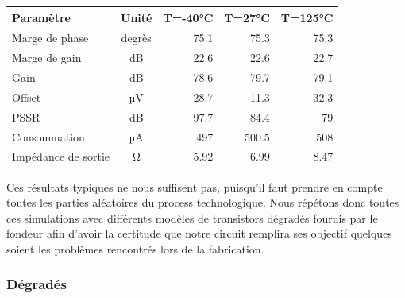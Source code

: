 \documentclass{article}
\begin{document}
\begin{center}
\begin{tabular}{|l|c|r|r|r|}
    \hline
    Paramètre & Unité & T=-40°C & T=27°C & T=125°C \\
    \hline
    Marge de phase & degrès & 75.1 & 75.3 & 75.3 \\
    \hline
    Marge de gain & dB & 22.6 & 22.6 & 22.7 \\
    \hline
    Gain & dB & 78.6 & 79.7 & 79.1 \\
    \hline
    Offset & µV & -28.7 & 11.3 & 32.3 \\
    \hline
    PSSR & dB & 97.7 & 84.4 & 79 \\
    \hline
    Consommation & µA & 497 & 500.5 & 508 \\
    \hline
    Impédance de sortie & Ω & 5.92 & 6.99 & 8.47 \\
    \hline
\end{tabular}
\end{center}

Ces résultats typiques ne nous suffisent pas, puisqu’il faut prendre en compte toutes les parties aléatoires du process technologique. Nous répétons donc toutes ces simulations avec différents modèles de transistors dégradés fournis par le fondeur afin d’avoir la certitude que notre circuit remplira ses objectif quelques soient les problèmes rencontrés lors de la fabrication.

\subsubsection{Dégradés}
\end{document}
